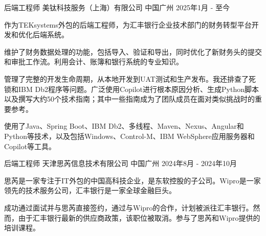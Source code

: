 
\begin{cventries}

  \cventry
    {后端工程师} %
    {美钛科技服务（上海）有限公司} %
    {中国广州} %
    {2025年1月 - 至今} %
    {
      \begin{cvitems} %
        \item {作为TEKsystems外包的后端工程师，为汇丰银行企业技术部门的财务转型平台开发和优化后端系统。}
        \item {维护了财务数据处理的功能，包括导入、验证和导出，同时优化了新财务头的提交和审批工作流。利用会计、账簿和银行系统的专业知识。}
        \item {管理了完整的开发生命周期，从本地开发到UAT测试和生产发布。我还排查了死锁和IBM Db2程序等问题。广泛使用Copilot进行根本原因分析、生成Python脚本以及撰写大约50个技术指南；其中一些指南成为了团队成员在面对类似挑战时的重要参考。}
        \item {使用了Java、Spring Boot、IBM Db2、多线程、Maven、Nexus、Angular和Python等技术，以及包括Windows、Control-M、IBM WebSphere应用服务器和Copilot等工具。}
      \end{cvitems}
    }

  \cventry
    {后端工程师} %
    {天津思芮信息技术有限公司} %
    {中国广州} %
    {2024年8月 - 2024年10月} %
    {
      \begin{cvitems} %
        \item {思芮是一家专注于IT外包的中国高科技企业，是东软控股的子公司。Wipro是一家领先的技术服务公司，汇丰银行是一家全球金融巨头。}
        \item {成功通过面试并与思芮直接签约，通过与Wipro的合作，计划被派往汇丰银行。然而，由于汇丰银行最新的供应商政策，该职位被取消。参与了思芮和Wipro提供的培训课程。}
      \end{cvitems}
    }


\end{cventries}
